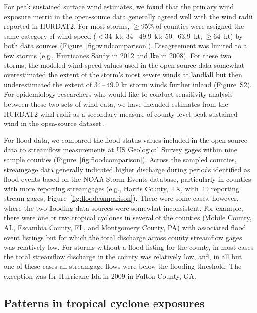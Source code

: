 For peak sustained surface wind estimates, we found that the primary wind
exposure metric in the open-source data generally agreed well with the wind
radii reported in \ac{HURDAT2}. For most storms, $\ge$95\% of counties were
assigned the same category of wind speed ($<$34~kt; 34\,--\,49.9~kt;
50\,--\,63.9~kt; $\ge$64~kt) by both data sources
(Figure~\ref{fig:windcomparison}).  Disagreement was limited to a few storms
(e.g., Hurricanes Sandy in 2012 and Ike in 2008). For these two storms, the
modeled wind speed values used in the open-source data somewhat overestimated
the extent of the storm's most severe winds at landfall but then underestimated
the extent of 34\,--\,49.9 kt storm winds further inland (Figure~S2). For
epidemiology researchers who would like to conduct sensitivity analysis between
these two sets of wind data, we have included estimates from the \ac{HURDAT2}
wind radii as a secondary measure of county-level peak sustained wind in the
open-source dataset \parencite{hurricaneexposuredata}.

For flood data, we compared the flood status values included in the open-source
data to streamflow measurements at \ac{US} Geological Survey gages within nine
sample counties (Figure~\ref{fig:floodcomparison}). Across the sampled
counties, streamgage data generally indicated higher discharge during periods
identified as flood events based on the NOAA Storm Events database,
particularly in counties with more reporting streamgages (e.g., Harris County,
TX, with~10 reporting stream gages; Figure~\ref{fig:floodcomparison}). There
were some cases, however, where the two flooding data sources were somewhat
inconsistent.  For example, there were one or two tropical cyclones in several
of the counties (Mobile County, AL, Escambia County, FL, and Montgomery County,
PA) with associated flood event listings but for which the total discharge
across county streamflow gages was relatively low. For storms without a flood
listing for the county, in most cases the total streamflow discharge in the
county was relatively low, and, in all but one of these cases all streamgage
flows were below the flooding threshold. The exception was for Hurricane Ida in
2009 in Fulton County, GA. 

\subsection*{Patterns in tropical cyclone exposures}

